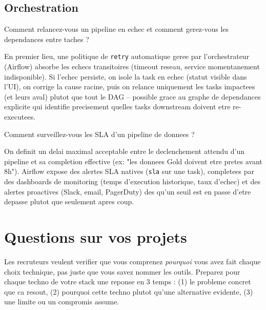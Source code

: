 \documentclass[11pt,a4paper]{article}
\begin{document}
\subsection{Orchestration}

\begin{question} Comment relancez-vous un pipeline en echec et comment gerez-vous les dependances entre taches ?
\end{question}
\begin{reponse}
En premier lieu, une politique de \texttt{retry} automatique geree par l'orchestrateur (Airflow) absorbe les echecs transitoires (timeout reseau, service momentanement indisponible). Si l'echec persiste, on isole la task en echec (statut visible dans l'UI), on corrige la cause racine, puis on relance uniquement les tasks impactees (et leurs aval) plutot que tout le DAG -- possible grace au graphe de dependances explicite qui identifie precisement quelles tasks downstream doivent etre re-executees.
\end{reponse}

\begin{question} Comment surveillez-vous les SLA d'un pipeline de donnees ?
\end{question}
\begin{reponse}
On definit un delai maximal acceptable entre le declenchement attendu d'un pipeline et sa completion effective (ex: "les donnees Gold doivent etre pretes avant 8h"). Airflow expose des alertes SLA natives (\texttt{sla} sur une task), completees par des dashboards de monitoring (temps d'execution historique, taux d'echec) et des alertes proactives (Slack, email, PagerDuty) des qu'un seuil est en passe d'etre depasse plutot que seulement apres coup.
\end{reponse}

\newpage
\section{Questions sur vos projets}

\begin{cle}
Les recruteurs veulent verifier que vous comprenez \emph{pourquoi} vous avez fait chaque choix technique, pas juste que vous savez nommer les outils. Preparez pour chaque techno de votre stack une reponse en 3 temps : (1) le probleme concret que ca resout, (2) pourquoi cette techno plutot qu'une alternative evidente, (3) une limite ou un compromis assume.
\end{cle}
\end{document}
